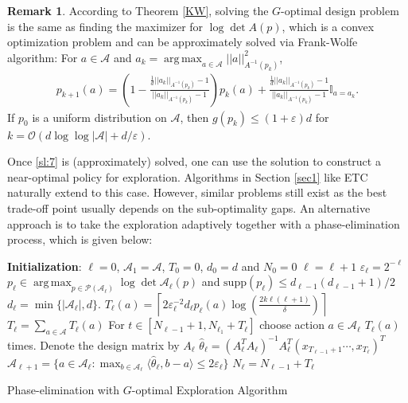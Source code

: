 \documentclass[letterpaper,11pt,openright,openany]{book}
\numberwithin{equation}{section}
\theoremstyle{plain}
\theoremstyle{definition}
\newtheorem{Rem}[Th]{Remark}
\def\e{{\varepsilon}}
\def\t{{\theta}}
\DeclareMathOperator*{\argmax}{arg\,max}
\begin{document}
\begin{Rem}
According to Theorem \ref{KW}, solving the $G$-optimal design problem is the same as finding the maximizer for $\log\det A(p)$, which is a convex optimization problem and can be approximately solved via Frank-Wolfe algorithm: For $a\in\mathcal A$ and $a_k = \argmax_{a\in\mathcal A}||a||_{A^{-1}(p_k)}^2$, 
\begin{align*}
p_{k+1}(a) = \left(1-\frac{\frac{1}{d}||a_k||_{A^{-1}(p_k)}-1}{||a_k||_{A^{-1}(p_k)}-1}\right)p_k(a) + \frac{\frac{1}{d}||a_k||_{A^{-1}(p_k)}-1}{||a_k||_{A^{-1}(p_k)}-1}\mathbb I_{a=a_k}.
\end{align*}
If $p_0$ is a uniform distribution on $\mathcal A$, then $g(p_k)\leq (1+\e)d$ for $k=\mathcal O(d\log\log |\mathcal A|+d/\e)$.
\end{Rem}

Once \eqref{sl:7} is (approximately) solved, one can use the solution to construct a near-optimal policy for exploration. Algorithms in Section \ref{sec1} like ETC naturally extend to this case. However, similar problems still exist as the best trade-off point usually depends on the sub-optimality gaps. An alternative approach is to take the exploration adaptively together with a phase-elimination process, which is given below:

\begin{algorithm}[H]
\begin{algorithmic}[1]
\STATE \textbf{Initialization}: $\ell = 0$, $\mathcal A_1 = \mathcal A$, $T_0 = 0$, $d_0=d$ and $N_0 = 0$
\STATE $\ell = \ell + 1$
\STATE $\e_\ell = 2^{-\ell}$
 \STATE $p_\ell \in\argmax_{p\in\mathcal P(\mathcal A_\ell)}\log\det \mathcal A_\ell(p)$ and $\text{supp}(p_\ell)\leq d_{\ell-1}(d_{\ell-1}+1)/2$
\STATE $d_\ell = \min\{|\mathcal A_\ell|, d\}$.
 \STATE $T_\ell(a)=\displaystyle\left\lceil 2\e_\ell^{-2}d_\ell p_\ell(a)\log\left(\frac{2k\ell(\ell+1)}{\delta}\right)\right\rceil$
 \ENDFOR
\STATE $T_\ell = \sum_{a\in\mathcal A}T_\ell(a)$
\STATE For $t\in [N_{\ell-1}+1,N_{\ell_1}+T_\ell]$ choose action $a\in\mathcal A_\ell$ $T_\ell(a)$ times. Denote the  design matrix by $A_\ell$ 
\STATE $\hat{\t}_\ell = (A^T_\ell A_\ell)^{-1}A_\ell^T(x_{T_{\ell-1}+1}\cdots, x_{T_\ell})^T$
\STATE $\mathcal A_{\ell+1} = \{a\in\mathcal A_\ell: \max_{b\in\mathcal A_\ell}\langle\hat{\t}_\ell, b-a\rangle\leq 2\e_\ell\}$ 
\STATE $N_\ell = N_{\ell-1} + T_\ell$
\ENDWHILE
\end{algorithmic}
\caption{Phase-elimination with $G$-optimal Exploration Algorithm } 
\label{alg:sl-finite}
\end{algorithm}
\end{document}
